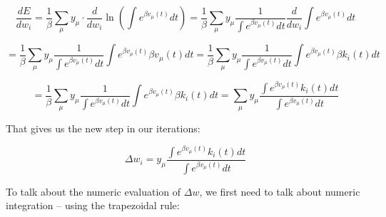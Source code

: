 \begin{equation}
\frac{dE}{dw_i} = \frac{1}{\beta}\sum_{\mu}{y_{\mu} \cdot 
\frac{d}{dw_i}\ln\left(\int e^{\beta v_{\mu}(t)} dt\right)} = \frac{1}{\beta}\sum_{\mu}{y_{\mu}\frac{1}{\int e^{\beta v_{\mu}(t)} dt}\frac{d}{dw_i}\int e^{\beta v_{\mu}(t)} dt}
\end{equation}

\begin{equation}
= \frac{1}{\beta}\sum_{\mu}{y_{\mu}\frac{1}{\int e^{\beta v_{\mu}(t)} dt}\int e^{\beta v_{\mu}(t)} \beta v_{\mu}(t) dt} = \frac{1}{\beta}\sum_{\mu}{y_{\mu}\frac{1}{\int e^{\beta v_{\mu}(t)} dt}\int e^{\beta v_{\mu}(t)} \beta k_i(t) dt}
\end{equation}

\begin{equation}
= \frac{1}{\beta}\sum_{\mu}{y_{\mu}\frac{1}{\int e^{\beta v_{\mu}(t)} dt}\int e^{\beta v_{\mu}(t)} \beta k_i(t) dt} = \sum_{\mu}{y_{\mu}\frac{\int e^{\beta v_{\mu}(t)} k_i(t) dt}{\int e^{\beta v_{\mu}(t)} dt}}
\end{equation}

That gives us the new step in our iterations:

\begin{equation}
\Delta w_i = y_{\mu}\frac{\int e^{\beta v_{\mu}(t)} k_i(t) dt}{\int e^{\beta v_{\mu}(t)} dt}
\end{equation}

To talk about the numeric evaluation of $\Delta w$, we first need to talk about numeric integration – using the trapezoidal rule:

\newtheorem{theorem}{Theorem}

